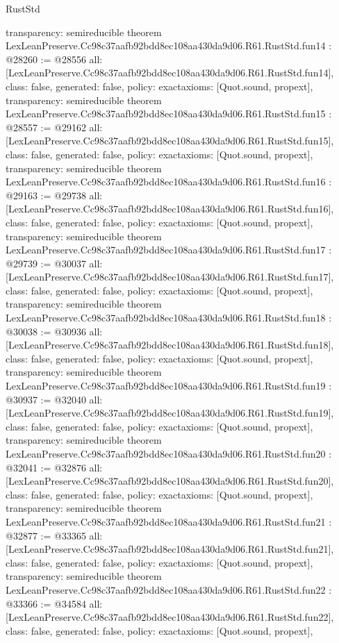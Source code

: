 \begin{lexlean}{RustStd}
\begin{coremodule}
{  transparency: semireducible
}
theorem LexLeanPreserve.Cc98c37aafb92bdd8ec108aa430da9d06.R61.RustStd.fun14 : @28260 := @28556 {
  all: [LexLeanPreserve.Cc98c37aafb92bdd8ec108aa430da9d06.R61.RustStd.fun14],
  class: false,
  generated: false,
  policy: exact{axioms: [Quot.sound, propext]},
  transparency: semireducible
}
theorem LexLeanPreserve.Cc98c37aafb92bdd8ec108aa430da9d06.R61.RustStd.fun15 : @28557 := @29162 {
  all: [LexLeanPreserve.Cc98c37aafb92bdd8ec108aa430da9d06.R61.RustStd.fun15],
  class: false,
  generated: false,
  policy: exact{axioms: [Quot.sound, propext]},
  transparency: semireducible
}
theorem LexLeanPreserve.Cc98c37aafb92bdd8ec108aa430da9d06.R61.RustStd.fun16 : @29163 := @29738 {
  all: [LexLeanPreserve.Cc98c37aafb92bdd8ec108aa430da9d06.R61.RustStd.fun16],
  class: false,
  generated: false,
  policy: exact{axioms: [Quot.sound, propext]},
  transparency: semireducible
}
theorem LexLeanPreserve.Cc98c37aafb92bdd8ec108aa430da9d06.R61.RustStd.fun17 : @29739 := @30037 {
  all: [LexLeanPreserve.Cc98c37aafb92bdd8ec108aa430da9d06.R61.RustStd.fun17],
  class: false,
  generated: false,
  policy: exact{axioms: [Quot.sound, propext]},
  transparency: semireducible
}
theorem LexLeanPreserve.Cc98c37aafb92bdd8ec108aa430da9d06.R61.RustStd.fun18 : @30038 := @30936 {
  all: [LexLeanPreserve.Cc98c37aafb92bdd8ec108aa430da9d06.R61.RustStd.fun18],
  class: false,
  generated: false,
  policy: exact{axioms: [Quot.sound, propext]},
  transparency: semireducible
}
theorem LexLeanPreserve.Cc98c37aafb92bdd8ec108aa430da9d06.R61.RustStd.fun19 : @30937 := @32040 {
  all: [LexLeanPreserve.Cc98c37aafb92bdd8ec108aa430da9d06.R61.RustStd.fun19],
  class: false,
  generated: false,
  policy: exact{axioms: [Quot.sound, propext]},
  transparency: semireducible
}
theorem LexLeanPreserve.Cc98c37aafb92bdd8ec108aa430da9d06.R61.RustStd.fun20 : @32041 := @32876 {
  all: [LexLeanPreserve.Cc98c37aafb92bdd8ec108aa430da9d06.R61.RustStd.fun20],
  class: false,
  generated: false,
  policy: exact{axioms: [Quot.sound, propext]},
  transparency: semireducible
}
theorem LexLeanPreserve.Cc98c37aafb92bdd8ec108aa430da9d06.R61.RustStd.fun21 : @32877 := @33365 {
  all: [LexLeanPreserve.Cc98c37aafb92bdd8ec108aa430da9d06.R61.RustStd.fun21],
  class: false,
  generated: false,
  policy: exact{axioms: [Quot.sound, propext]},
  transparency: semireducible
}
theorem LexLeanPreserve.Cc98c37aafb92bdd8ec108aa430da9d06.R61.RustStd.fun22 : @33366 := @34584 {
  all: [LexLeanPreserve.Cc98c37aafb92bdd8ec108aa430da9d06.R61.RustStd.fun22],
  class: false,
  generated: false,
  policy: exact{axioms: [Quot.sound, propext]},
}
\end{coremodule}
\end{lexlean}
